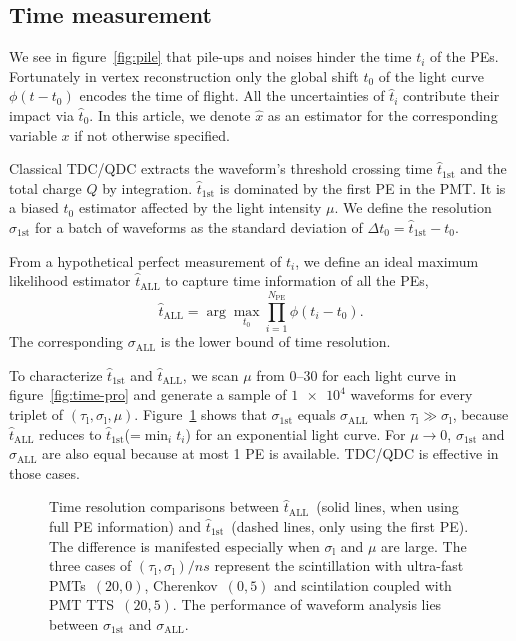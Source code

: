\subsection{Time measurement}
We see in figure~\ref{fig:pile} that pile-ups and noises hinder the time $t_i$ of the PEs. Fortunately in vertex reconstruction only the global shift $t_0$ of the light curve $\phi(t-t_0)$ encodes the time of flight.  All the uncertainties of $\hat{t}_i$ contribute their impact via $\hat{t}_0$. In this article, we denote $\hat{x}$ as an estimator for the corresponding variable $x$ if not otherwise specified.

Classical TDC/QDC extracts the waveform's threshold crossing time $\hat{t}_\mathrm{1st}$ and the total charge $Q$ by integration.  $\hat{t}_\mathrm{1st}$ is dominated by the first PE in the PMT.  It is a biased $t_0$ estimator affected by the light intensity $\mu$. We define the resolution $\sigma_\mathrm{1st}$ for a batch of waveforms as the standard deviation of $\Delta t_0 = \hat{t}_\mathrm{1st} - t_0$.

From a hypothetical perfect measurement of $t_i$, we define an ideal maximum likelihood estimator $\hat{t}_\mathrm{ALL}$ to capture time information of all the PEs,
\begin{equation}
  \label{eq:2}
  \hat{t}_\mathrm{ALL} = \arg\underset{t_0}{\max} \prod_{i=1}^{N_\mathrm{PE}} \phi(t_i-t_0).
\end{equation}
The corresponding $\sigma_\mathrm{ALL}$ is the lower bound of time resolution. 

To characterize $\hat{t}_\mathrm{1st}$ and $\hat{t}_\mathrm{ALL}$, we scan $\mu$ from \numrange{0}{30} for each light curve in figure~\ref{fig:time-pro} and generate a sample of $\num[retain-unity-mantissa=false]{1e4}$ waveforms for every triplet of $(\tau_\mathrm{l}, \sigma_\mathrm{l}, \mu)$.  Figure~\ref{fig:reso-diff} shows that $\sigma_{\mathrm{1st}}$ equals $\sigma_{\mathrm{ALL}}$ when $\tau_\mathrm{l} \gg \sigma_\mathrm{l}$, because $\hat{t}_\mathrm{ALL}$ reduces to $\hat{t}_\mathrm{1st}$(=$\min_i t_i$) for an exponential light curve. For $\mu \to 0$, $\sigma_{\mathrm{1st}}$ and $\sigma_{\mathrm{ALL}}$ are also equal because at most 1 PE is available.  TDC/QDC is effective in those cases.

\begin{figure}[H]
  \centering
  \resizebox{0.8\textwidth}{!}{}
  \caption{\label{fig:reso-diff} Time resolution comparisons between $\hat{t}_{\mathrm{ALL}}$~(solid lines, when using full PE information) and $\hat{t}_\mathrm{1st}$~(dashed lines, only using the first PE). The difference is manifested especially when $\sigma_\mathrm{l}$ and $\mu$ are large. The three cases of $(\tau_\mathrm{l}, \sigma_\mathrm{l})/\si{ns}$ represent the scintillation with ultra-fast PMTs~$(20, 0)$, Cherenkov~$(0, 5)$ and scintilation coupled with PMT TTS~$(20, 5)$. The performance of waveform analysis lies between $\sigma_{\mathrm{1st}}$ and $\sigma_{\mathrm{ALL}}$. }
\end{figure}

